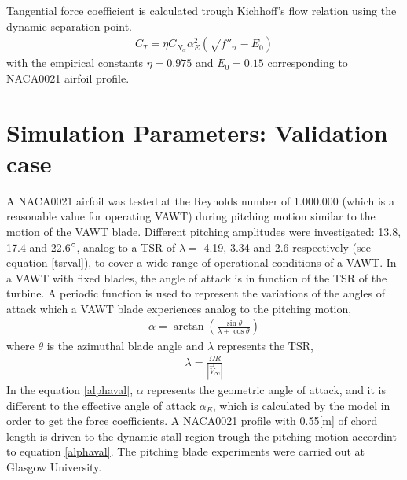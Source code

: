 \documentclass[a4paper]{jpconf}
\begin{document}
Tangential force coefficient is calculated trough Kichhoff's flow relation using the dynamic separation point.
\begin{align}
C_T = \eta C_{N_\alpha} \alpha_E ^2 ( \sqrt{f''_n}-E_0)     \label{CT}
\end{align}
with the empirical constants $\eta = 0.975$ and $E_0 = 0.15$ corresponding to NACA0021 airfoil profile.





\section{Simulation Parameters: Validation case}
A NACA0021 airfoil was tested at the Reynolds number of 1.000.000 (which is a
reasonable value for operating VAWT) during pitching motion similar to the motion
of the VAWT blade. Different pitching amplitudes were investigated: 13.8, 17.4 and 22.6$\degree$, analog to a TSR of $\lambda=$ 4.19, 3.34 and 2.6 respectively (see equation \ref{tsrval}), to cover a wide range of operational conditions of a VAWT.  In a VAWT with
fixed blades, the angle of attack is in function of the TSR of the turbine. A
periodic function is used to represent the variations of the angles of attack
which a VAWT blade experiences analog to the pitching motion,
\begin{eqnarray}
    \alpha = \arctan \left( \frac{\sin \theta}{\lambda + \cos \theta} \right) \label{alphaval}
\end{eqnarray}
where $\theta$ is the azimuthal blade angle and $ \lambda $ represents the TSR,
\begin{eqnarray}
    \lambda =  \frac{\Omega R}{ |\vec{V}_\infty | } \label{tsrval}
\end{eqnarray}
In the equation \ref{alphaval}, $\alpha$ represents the geometric angle of attack, and it is different to the effective angle of attack $\alpha_E$, which is calculated by the model in order to get the force coefficients. A NACA0021 profile with 0.55[m] of chord length is driven to the dynamic stall region trough the pitching motion accordint to equation \ref{alphaval}. The pitching blade experiments were carried out at Glasgow
University\cite{angell1988collected}.
\end{document}
